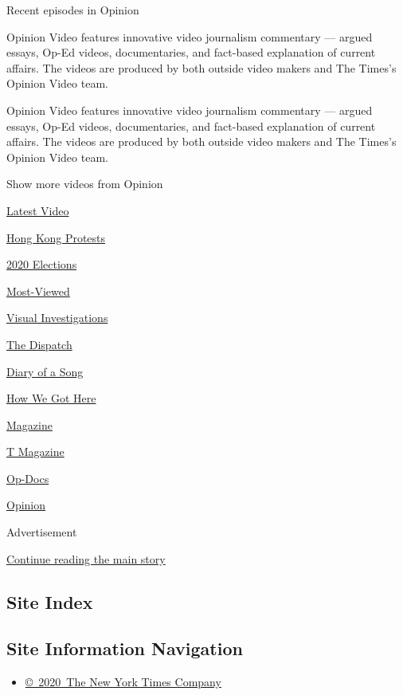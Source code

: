 Recent episodes in Opinion

Opinion Video features innovative video journalism commentary --- argued
essays, Op-Ed videos, documentaries, and fact-based explanation of
current affairs. The videos are produced by both outside video makers
and The Times's Opinion Video team.

Opinion Video features innovative video journalism commentary --- argued
essays, Op-Ed videos, documentaries, and fact-based explanation of
current affairs. The videos are produced by both outside video makers
and The Times's Opinion Video team.

Show more videos from Opinion

\href{/video}{}

\href{/video/latest-video}{Latest Video}

\href{/video/hk-protest}{Hong Kong Protests}

\href{/video/2020-Elections}{2020 Elections}

\href{/video/Most-Viewed}{Most-Viewed}

\href{/video/investigations}{Visual Investigations}

\href{/video/on-the-ground}{The Dispatch}

\href{/video/diaryofasong}{Diary of a Song}

\href{/video/how-we-got-here}{How We Got Here}

\href{/video/magazine}{Magazine}

\href{/video/t-magazine}{T Magazine}

\href{/video/op-docs}{Op-Docs}

\href{/video/opinion}{Opinion}

Advertisement

\protect\hyperlink{after-bottom}{Continue reading the main story}

\hypertarget{site-index}{%
\subsection{Site Index}\label{site-index}}

\hypertarget{site-information-navigation}{%
\subsection{Site Information
Navigation}\label{site-information-navigation}}

\begin{itemize}
\tightlist
\item
  \href{https://help.nytimes.com/hc/en-us/articles/115014792127-Copyright-notice}{©~2020~The
  New York Times Company}
\end{itemize}

